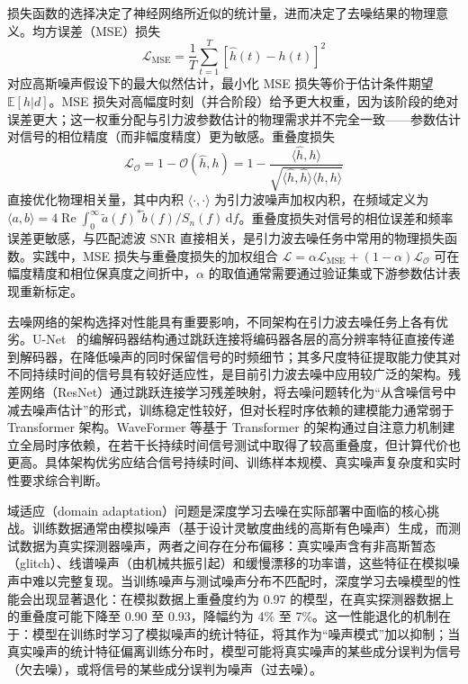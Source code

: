 损失函数的选择决定了神经网络所近似的统计量，进而决定了去噪结果的物理意义。均方误差（MSE）损失
\begin{equation}
  \mathcal{L}_{\mathrm{MSE}} = \frac{1}{T} \sum_{t=1}^{T} [\hat{h}(t) - h(t)]^2
\end{equation}
对应高斯噪声假设下的最大似然估计，最小化 MSE 损失等价于估计条件期望 $\mathbb{E}[h|d]$。MSE 损失对高幅度时刻（并合阶段）给予更大权重，因为该阶段的绝对误差更大；这一权重分配与引力波参数估计的物理需求并不完全一致——参数估计对信号的相位精度（而非幅度精度）更为敏感。重叠度损失
\begin{equation}
  \mathcal{L}_{\mathcal{O}} = 1 - \mathcal{O}(\hat{h}, h) = 1 - \frac{\langle \hat{h}, h \rangle}{\sqrt{\langle \hat{h}, \hat{h} \rangle \langle h, h \rangle}}
\end{equation}
直接优化物理相关量，其中内积 $\langle \cdot, \cdot \rangle$ 为引力波噪声加权内积，在频域定义为 $\langle a, b \rangle = 4 \operatorname{Re} \int_0^\infty \tilde{a}(f)^* \tilde{b}(f) / S_n(f) \, \mathrm{d}f$。重叠度损失对信号的相位误差和频率误差更敏感，与匹配滤波 SNR 直接相关，是引力波去噪任务中常用的物理损失函数。实践中，MSE 损失与重叠度损失的加权组合 $\mathcal{L} = \alpha \mathcal{L}_{\mathrm{MSE}} + (1-\alpha) \mathcal{L}_{\mathcal{O}}$ 可在幅度精度和相位保真度之间折中，$\alpha$ 的取值通常需要通过验证集或下游参数估计表现重新标定。

去噪网络的架构选择对性能具有重要影响，不同架构在引力波去噪任务上各有优劣。U-Net~\cite{Ronneberger2015UNet} 的编解码器结构通过跳跃连接将编码器各层的高分辨率特征直接传递到解码器，在降低噪声的同时保留信号的时频细节；其多尺度特征提取能力使其对不同持续时间的信号具有较好适应性，是目前引力波去噪中应用较广泛的架构。残差网络（ResNet）通过跳跃连接学习残差映射，将去噪问题转化为“从含噪信号中减去噪声估计”的形式，训练稳定性较好，但对长程时序依赖的建模能力通常弱于 Transformer 架构。WaveFormer 等基于 Transformer 的架构通过自注意力机制建立全局时序依赖，在若干长持续时间信号测试中取得了较高重叠度，但计算代价也更高。具体架构优劣应结合信号持续时间、训练样本规模、真实噪声复杂度和实时性要求综合判断。

域适应（domain adaptation）问题是深度学习去噪在实际部署中面临的核心挑战。训练数据通常由模拟噪声（基于设计灵敏度曲线的高斯有色噪声）生成，而测试数据为真实探测器噪声，两者之间存在分布偏移：真实噪声含有非高斯暂态（glitch）、线谱噪声（由机械共振引起）和缓慢漂移的功率谱，这些特征在模拟噪声中难以完整复现。当训练噪声与测试噪声分布不匹配时，深度学习去噪模型的性能会出现显著退化：在模拟数据上重叠度约为 0.97 的模型，在真实探测器数据上的重叠度可能下降至 0.90 至 0.93，降幅约为 4\% 至 7\%。这一性能退化的机制在于：模型在训练时学习了模拟噪声的统计特征，将其作为“噪声模式”加以抑制；当真实噪声的统计特征偏离训练分布时，模型可能将真实噪声的某些成分误判为信号（欠去噪），或将信号的某些成分误判为噪声（过去噪）。

